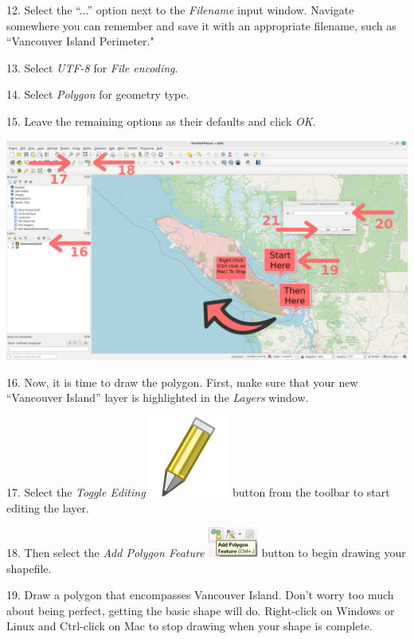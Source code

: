 \documentclass[oneside,a4paper,11pt,explicit]{book}
\begin{document}
	12. Select the ``...'' option next to the \textit{Filename} input window. Navigate somewhere you can remember and save it with an appropriate filename, such as ``Vancouver Island Perimeter."
	
	13. Select \textit{UTF-8} for \textit{File encoding}.
	
	14. Select \textit{Polygon} for geometry type. 
	
	15. Leave the remaining options as their defaults and click \textit{OK}.
	
	\centerline{\includegraphics[width=\textwidth]{DrawPolygon.png}}
	
	16. Now, it is time to draw the polygon. First, make sure that your new ``Vancouver Island'' layer is highlighted in the \textit{Layers} window. 
	
	17. Select the \textit{Toggle Editing} \includegraphics[height=\fontcharht\font`\B]{mActionToggleEditing.png} button from the toolbar to start editing the layer. 
	
	18. Then select the \textit{Add Polygon Feature} \includegraphics[height=10mm]{addpolygon.png} button to begin drawing your shapefile. 
	
	19. Draw a polygon that encompasses Vancouver Island. Don't worry too much about being perfect, getting the basic shape will do. Right-click on Windows or Linux and Ctrl-click on Mac to stop drawing when your shape is complete.
	
\end{document}
